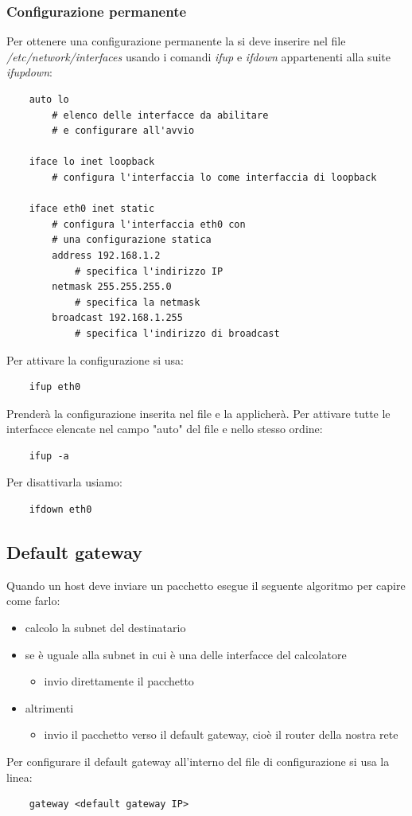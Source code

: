 \subsubsection{Configurazione permanente}
Per ottenere una configurazione permanente la si deve inserire nel file \emph{/etc/network/interfaces} usando i comandi \emph{ifup} e \emph{ifdown} appartenenti alla suite \emph{ifupdown}:
\begin{verbatim}
    auto lo
        # elenco delle interfacce da abilitare
        # e configurare all'avvio
        
    iface lo inet loopback
        # configura l'interfaccia lo come interfaccia di loopback
    
    iface eth0 inet static
        # configura l'interfaccia eth0 con
        # una configurazione statica
        address 192.168.1.2
            # specifica l'indirizzo IP
        netmask 255.255.255.0
            # specifica la netmask
        broadcast 192.168.1.255
            # specifica l'indirizzo di broadcast
\end{verbatim}
Per attivare la configurazione si usa:
\begin{verbatim}
    ifup eth0
\end{verbatim}
Prenderà la configurazione inserita nel file e la applicherà.
Per attivare tutte le interfacce elencate nel campo "auto" del file e nello stesso ordine:
\begin{verbatim}
    ifup -a
\end{verbatim}
Per disattivarla usiamo:
\begin{verbatim}
    ifdown eth0
\end{verbatim}

\subsection{Default gateway}
Quando un host deve inviare un pacchetto esegue il seguente algoritmo per capire come farlo:
\begin{itemize}
    \item calcolo la subnet del destinatario
    \item se è uguale alla subnet in cui è una delle interfacce del calcolatore
    \begin{itemize}
        \item invio direttamente il pacchetto
    \end{itemize}
    \item altrimenti
    \begin{itemize}
        \item invio il pacchetto verso il default gateway, cioè il router della nostra rete
    \end{itemize}
\end{itemize}
Per configurare il default gateway all'interno del file di configurazione si usa la linea:
\begin{verbatim}
    gateway <default gateway IP>
\end{verbatim}

